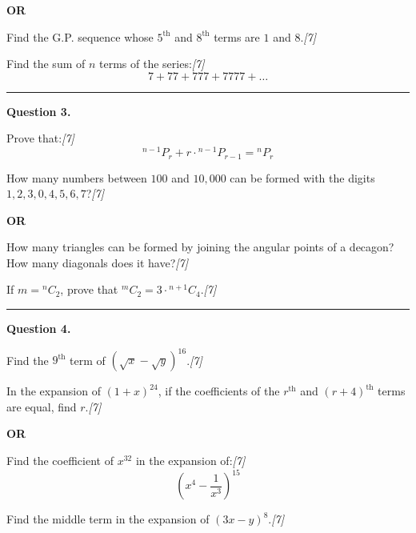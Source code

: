 \documentclass[11pt,a4paper]{article}
\newcommand{\pts}[1]{\hfill   \textit{[#1]}}
\begin{document}
\centerline{   \textbf{OR}}


\begin{parts}
  \item Find the G.P. sequence whose $5^{ \text{th}}$ and $8^{ \text{th}}$ terms are $1$ and $8$.\pts{7}
  \item Find the sum of $n$ terms of the series:\pts{7}
  \[
  7 + 77 + 777 + 7777 + \dots
  \]
\end{parts}

\medskip\rule{\linewidth}{0.2pt}




\noindent   \textbf{Question 3.}

\begin{parts}
  \item Prove that:\pts{7}
  \[
  {}^{n-1}P_r + r \cdot {}^{n-1}P_{r-1} = {}^nP_r
  \]
  \item How many numbers between $100$ and $10,000$ can be formed with the digits $1, 2, 3, 0, 4, 5, 6, 7$?\pts{7}
\end{parts}

\centerline{   \textbf{OR}}


\begin{parts}
  \item How many triangles can be formed by joining the angular points of a decagon? How many diagonals does it have?\pts{7}
  \item If $m = {}^nC_2$, prove that ${}^mC_2 = 3 \cdot {}^{n+1}C_4$.\pts{7}
\end{parts}

\medskip\rule{\linewidth}{0.2pt}




\noindent   \textbf{Question 4.}

\begin{parts}
  \item Find the $9^{ \text{th}}$ term of $(\sqrt{x} - \sqrt{y})^{16}$.\pts{7}
  \item In the expansion of $(1 + x)^{24}$, if the coefficients of the $r^{ \text{th}}$ and $(r + 4)^{ \text{th}}$ terms are equal, find $r$.\pts{7}
\end{parts}

\centerline{   \textbf{OR}}


\begin{parts}
  \item Find the coefficient of $x^{32}$ in the expansion of:\pts{7}
  \[
  \left(x^4 - \frac{1}{x^3}\right)^{15}
  \]
  \item Find the middle term in the expansion of $(3x - y)^8$.\pts{7}
\end{parts}
\end{document}
